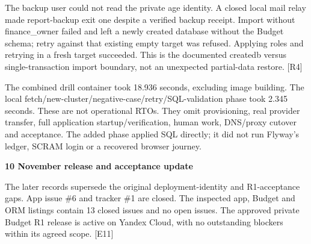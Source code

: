 \documentclass[11pt,a4paper]{article}
\begin{document}
The backup user could not read the private age identity. A closed local mail relay made report-backup exit one despite a verified backup receipt. Import without finance\_owner failed and left a newly created database without the Budget schema; retry against that existing empty target was refused. Applying roles and retrying in a fresh target succeeded. This is the documented createdb versus single-transaction import boundary, not an unexpected partial-data restore. [R4]

The combined drill container took 18.936 seconds, excluding image building. The local fetch/\allowbreak{}new-cluster/\allowbreak{}negative-case/\allowbreak{}retry/\allowbreak{}SQL-validation phase took 2.345 seconds. These are not operational RTOs. They omit provisioning, real provider transfer, full application startup/\allowbreak{}verification, human work, DNS/\allowbreak{}proxy cutover and acceptance. The added phase applied SQL directly; it did not run Flyway's ledger, SCRAM login or a recovered browser journey.

\textbf{10 November release and acceptance update}

The later records supersede the original deployment-identity and R1-acceptance gaps. App issue \#6 and tracker \#1 are closed. The inspected app, Budget and ORM listings contain 13 closed issues and no open issues. The approved private Budget R1 release is active on Yandex Cloud, with no outstanding blockers within its agreed scope. [E11]
\end{document}

